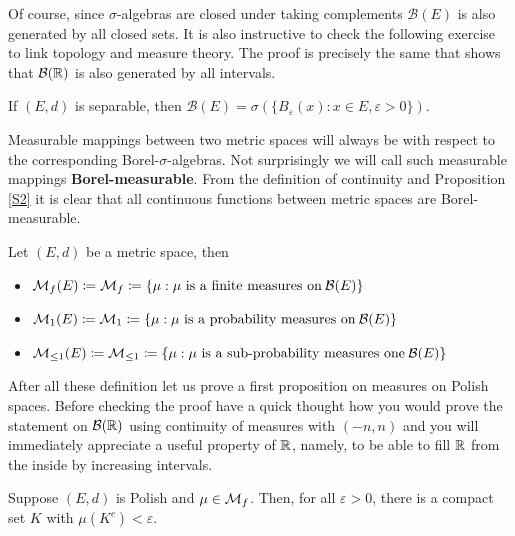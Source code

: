Of course, since $\sigma$-algebras are closed under taking complements $\mathcal B(E)$ is also generated by all closed sets. It is also instructive to check the following exercise to link topology and measure theory. The proof is precisely the same that shows that $\mathcal B(\mathbb{R})$ is also generated by all intervals.
\begin{luebung}
	If $(E,d)$ is separable, then $\mathcal B(E)=\sigma(\{B_\varepsilon (x):x\in E, \varepsilon >0\}).$
\end{luebung}
Measurable mappings between two metric spaces will always be with respect to the corresponding Borel-$\sigma$-algebras. Not surprisingly we will call such measurable mappings \textbf{Borel-measurable}. From the definition of continuity and Proposition \ref{S2} it is clear that all continuous functions between metric spaces are Borel-measurable.
\begin{ldef}
\begin{deff}
	Let $(E,d)$ be a metric space, then
	\begin{itemize}
		\item
			$\mathcal{M}_f(E) \coloneqq \mathcal{M}_f \coloneqq \{ \mu: \mu \text{ is a finite measures on}\: \mathcal{B}(E) \}$
		\item
			$\mathcal{M}_1(E) \coloneqq \mathcal{M}_1 \coloneqq \{\mu:  \mu \text{ is a probability measures on}\: \mathcal{B}(E) \}$
		\item
			$\mathcal{M}_{\leq 1}(E) \coloneqq \mathcal{M}_{\leq 1} \coloneqq \{ \mu:\mu\text{ is a sub-probability measures one}\: \mathcal{B}(E) \}$
	\end{itemize}
\end{deff}
\end{ldef}
After all these definition let us prove a first proposition on measures on Polish spaces. Before checking the proof have a quick thought how you would prove the statement on $\mathcal B(\mathbb{R})$ using continuity of measures with $(-n,n)$ and you will immediately appreciate a useful property of $\mathbb{R}$, namely, to be able to fill $\mathbb{R}$ from the inside by increasing intervals.
\begin{llemma}
\begin{prop}\label{prop_4120}
	Suppose $(E,d)$ is Polish and $\mu \in \mathcal{M}_f$. Then, for all $\varepsilon > 0$, there is a compact set $K$ with $\mu(K^c)<\varepsilon$.
\end{prop}
\end{llemma}
